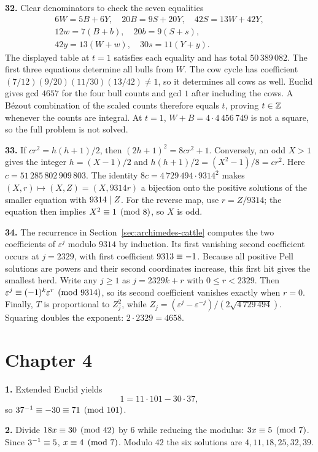 \textbf{32.} Clear denominators to check the seven equalities
\begin{gather*}
 6W=5B+6Y,\quad20B=9S+20Y,\quad42S=13W+42Y,\\
 12w=7(B+b),\quad20b=9(S+s),\\
 42y=13(W+w),\quad30s=11(Y+y).
\end{gather*}
The displayed table at $t=1$ satisfies each equality and has total
$50\,389\,082$. The first three equations determine all bulls from
$W$. The cow cycle has coefficient
$(7/12)(9/20)(11/30)(13/42)\ne1$, so it determines all cows as well.
Euclid gives gcd $4657$ for the four bull counts and gcd $1$ after
including the cows. A B\'ezout combination of the scaled counts
therefore equals $t$, proving $t\in\mathbb Z$ whenever the counts are
integral. At $t=1$, $W+B=4\cdot4\,456\,749$ is not a square,
so the full problem is not solved.

\textbf{33.} If $cr^2=h(h+1)/2$, then
$(2h+1)^2=8cr^2+1$. Conversely, an odd $X>1$ gives the integer
$h=(X-1)/2$ and $h(h+1)/2=(X^2-1)/8=cr^2$.
Here $c=51\,285\,802\,909\,803$.
The identity $8c=4\,729\,494\cdot9314^2$ makes
$(X,r)\mapsto(X,Z)=(X,9314r)$ a bijection onto the positive
solutions of the smaller equation with $9314\mid Z$.
For the reverse map, use $r=Z/9314$; the equation then implies
$X^2\equiv1\pmod8$, so $X$ is odd.

\textbf{34.} The recurrence in Section~\ref{sec:archimedes-cattle}
computes the two coefficients of $\varepsilon^j$ modulo $9314$
by induction. Its first vanishing second coefficient occurs at
$j=2329$, with first coefficient $9313\equiv-1$.
Because all positive Pell solutions are powers and their second
coordinates increase, this first hit gives the smallest herd.
Write any $j\ge1$ as $j=2329k+r$ with $0\le r<2329$.
Then $\varepsilon^j\equiv(-1)^k\varepsilon^r\pmod{9314}$,
so its second coefficient vanishes exactly when $r=0$.
Finally, $T$ is proportional to $Z_j^2$, while
$Z_j=(\varepsilon^j-\varepsilon^{-j})/(2\sqrt{4\,729\,494})$.
Squaring doubles the exponent: $2\cdot2329=4658$.

\section*{Chapter 4}

\textbf{1.} Extended Euclid yields
\[
1=11\cdot101-30\cdot37,
\]
so $37^{-1}\equiv-30\equiv71\pmod{101}$.

\textbf{2.} Divide $18x\equiv30\pmod{42}$ by $6$ while reducing the modulus: $3x\equiv5\pmod7$. Since $3^{-1}\equiv5$, $x\equiv4\pmod7$. Modulo $42$ the six solutions are $4,11,18,25,32,39$.

